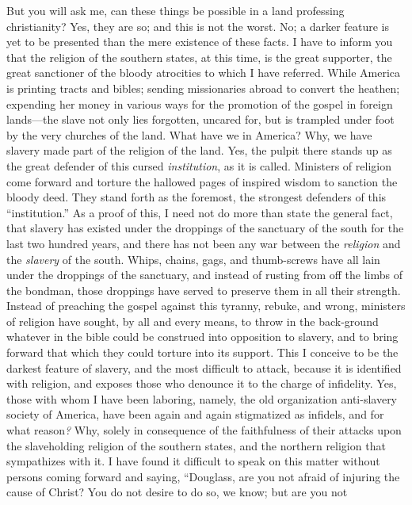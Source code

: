 But you will ask me, can these things be possible in a land professing
christianity? Yes, they are so; and this is not the worst. No; a darker
feature is yet to be presented than the mere existence of these facts. I
have to inform you that the religion of the southern states, at this
time, is the great supporter, the great sanctioner of the bloody
atrocities to which I have referred. While America is printing tracts
and bibles; sending missionaries abroad to convert the heathen;
expending her money in various ways for the promotion of the gospel in
foreign lands---the slave not only lies forgotten, uncared for, but is
trampled under foot by the very churches of the land. What have we in
America? Why, we have slavery made part of the religion of the land.
Yes, the pulpit there stands up as the great defender of this cursed
\emph{institution}, as it is called. Ministers of religion come forward
and torture the hallowed pages of inspired wisdom to sanction the bloody
deed. They stand forth as the foremost, the strongest defenders of this
``institution.'' As a proof of this, I need not do more than state the
general fact, that slavery has existed under the droppings of the
sanctuary of the south for the last two hundred years, and there has not
been any war between the \emph{religion} and the \emph{slavery} of the
south. Whips, chains, gags, and thumb-screws have all lain under the
droppings of the sanctuary, and instead of rusting from off the limbs of
the bondman, those droppings have served to preserve them in all their
strength. Instead of preaching the gospel against this tyranny, rebuke,
and wrong, ministers of religion have sought, by all and every means, to
throw in the back-ground whatever in the bible could be construed into
opposition to slavery, and to bring forward that which they could
torture into its support. This I conceive to be the darkest feature of
slavery, and the most difficult to attack, because it is identified with
religion, and exposes those who denounce it to the charge of infidelity.
Yes, those with whom I have been laboring, namely, the old organization
anti-slavery society of America, have been again and again stigmatized
as infidels, and for what reason\emph{?} Why, solely in consequence of
the faithfulness of their attacks upon the slaveholding religion of the
southern states, and the northern religion that sympathizes with it. I
have found it difficult to speak on this matter without persons coming
forward and {}saying, ``Douglass, are you not afraid of injuring the
cause of Christ? You do not desire to do so, we know; but are you not
